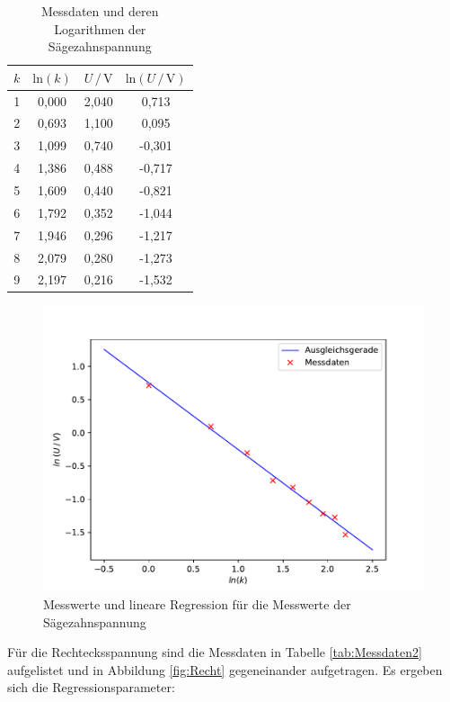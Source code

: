 \begin{table}
    \centering
    \caption{Messdaten und deren Logarithmen der Sägezahnspannung}
    \label{tab:Messdaten1}
    \begin{tabular}{c c c c}
    \toprule
    $k$ & $\text{ln} (k)$ & $U \,/\, \si{\volt}$ & $\text{ln}(U \,/\, \si{\volt})$ \\
    \midrule
    1 & 0,000 & 2,040 &  0,713 \\
    2 & 0,693 & 1,100 &  0,095 \\
    3 & 1,099 & 0,740 & -0,301 \\
    4 & 1,386 & 0,488 & -0,717 \\
    5 & 1,609 & 0,440 & -0,821 \\
    6 & 1,792 & 0,352 & -1,044 \\
    7 & 1,946 & 0,296 & -1,217 \\
    8 & 2,079 & 0,280 & -1,273 \\
    9 & 2,197 & 0,216 & -1,532 \\
    \bottomrule
    \end{tabular}
\end{table} 

\begin{figure}
    \centering
    \includegraphics[scale=1.0]{content/plot1.pdf}
    \caption{Messwerte und lineare Regression für die Messwerte der Sägezahnspannung}
    \label{fig:Säge}
\end{figure}

Für die Rechtecksspannung sind die Messdaten in Tabelle \ref{tab:Messdaten2} aufgelistet und in Abbildung \ref{fig:Recht}
gegeneinander aufgetragen. Es ergeben sich die Regressionsparameter:

